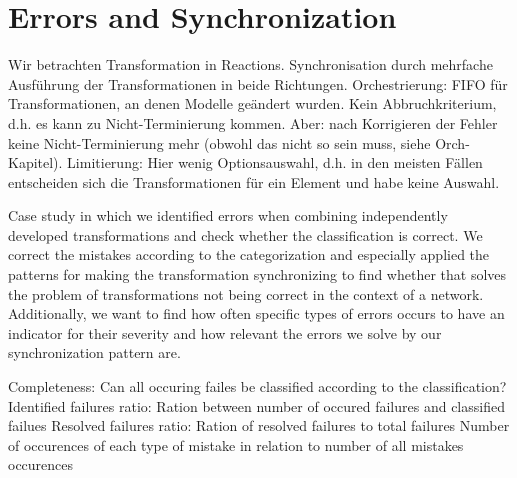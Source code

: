\section{Errors and Synchronization}

Wir betrachten Transformation in Reactions.
Synchronisation durch mehrfache Ausführung der Transformationen in beide Richtungen.
Orchestrierung: FIFO für Transformationen, an denen Modelle geändert wurden. Kein Abbruchkriterium, d.h. es kann zu Nicht-Terminierung kommen. Aber: nach Korrigieren der Fehler keine Nicht-Terminierung mehr (obwohl das nicht so sein muss, siehe Orch-Kapitel). Limitierung: Hier wenig Optionsauswahl, d.h. in den meisten Fällen entscheiden sich die Transformationen für ein Element und habe keine Auswahl.


Case study in which we identified errors when combining independently developed transformations and check whether the classification is correct. We correct the mistakes according to the categorization and especially applied the patterns for making the transformation synchronizing to find whether that solves the problem of transformations not being correct in the context of a network. Additionally, we want to find how often specific types of errors occurs to have an indicator for their severity and how relevant the errors we solve by our synchronization pattern are.

{Completeness: Can all occuring failes be classified according to the classification?}
{Identified failures ratio: Ration between number of occured failures and classified failues}
{Resolved failures ratio: Ration of resolved failures to total failures}
{Number of occurences of each type of mistake in relation to number of all mistakes occurences}

